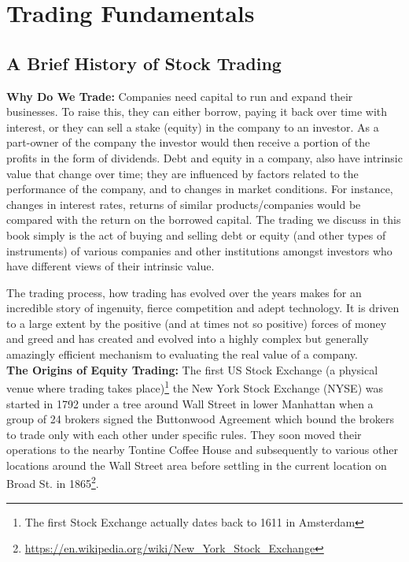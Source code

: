 \chapter{Trading Fundamentals}\label{chap:ch_trading_fund}
\section{A Brief History of Stock Trading}

\noindent\textbf{Why Do We Trade:} Companies need capital to run and expand their businesses. To raise this, they can either borrow, paying it back over time with interest, or they can sell a stake (equity) in the company to an investor. As a part-owner of the company the investor would then receive a portion of the profits in the form of dividends. Debt and equity in a company, also have intrinsic value that change over time; they are influenced by factors related to the performance of the company, and to changes in market conditions. For instance, changes in interest rates, returns of similar products/companies would be compared with the return on the borrowed capital. The trading we discuss in this book simply is the act of buying and selling debt or equity (and other types of instruments) of various companies and other institutions amongst investors who have different views of their intrinsic value.


The trading process, how trading has evolved over the years makes for an incredible story of ingenuity, fierce competition and adept technology. It is driven to a large extent by the positive (and at times not so positive) forces of money and greed and has created and evolved into a highly complex but generally amazingly efficient mechanism to evaluating the real value of a company. \\


\noindent\textbf{The Origins of Equity Trading:} The first US Stock Exchange (a physical venue where trading takes place)\footnote{The first Stock Exchange actually dates back to 1611 in Amsterdam} the New York Stock Exchange (NYSE) was started in 1792 under a tree around Wall Street in lower Manhattan when a group of 24 brokers signed the Buttonwood Agreement which bound the brokers to trade only with each other under specific rules. They soon moved their operations to the nearby Tontine Coffee House and subsequently to various other locations around the Wall Street area before settling in the current location on Broad St. in 1865\footnote{\url{https://en.wikipedia.org/wiki/New_York_Stock_Exchange}}.\\


